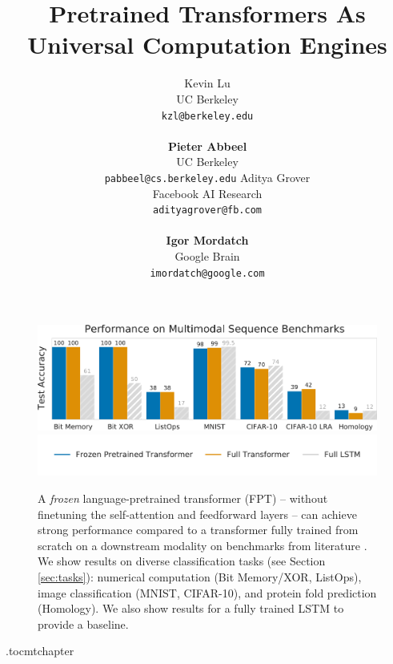 \documentclass{article} %
\title{Pretrained Transformers As \\ Universal Computation Engines}
\author{Kevin Lu \\
UC Berkeley \\
\texttt{kzl@berkeley.edu} \\
\\
\textbf{Pieter Abbeel} \\
UC Berkeley \\
\texttt{pabbeel@cs.berkeley.edu}
\And
Aditya Grover \\
Facebook AI Research \\
\texttt{adityagrover@fb.com} \\
\\
\textbf{Igor Mordatch} \\
Google Brain \\
\texttt{imordatch@google.com}
}
\begin{document}
\maketitle

\begin{abstract}

\end{abstract}

\begin{figure}[h]
    \centering
    \includegraphics[width=1\linewidth]{figures/main/performance.pdf}
    \vspace{0.5em}
    \includegraphics[width=0.9\linewidth]{figures/main/legend.pdf}
    \caption{
    A \emph{frozen} language-pretrained transformer (FPT) -- without finetuning the self-attention and feedforward layers -- can achieve strong performance compared to a transformer fully trained from scratch on a downstream modality on benchmarks from literature \citep{tay2020lra, rap2019tape}.
    We show results on diverse classification tasks (see Section \ref{sec:tasks}): numerical computation (Bit Memory/XOR, ListOps), image classification (MNIST, CIFAR-10), and protein fold prediction (Homology).
    We also show results for a fully trained LSTM to provide a baseline.
    }
    \label{fig:main_result}
\end{figure}

\clearpage

\etocdepthtag.toc{mtchapter}
\tableofcontents

\clearpage










\end{document}
